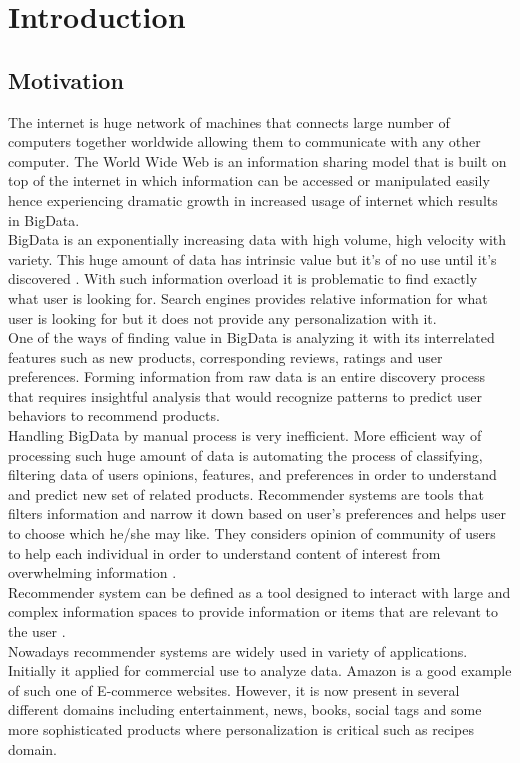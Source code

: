 \chapter{Introduction}
\section{Motivation}
The internet is huge network of machines that connects large number of computers together worldwide allowing them to communicate with any other computer. The World Wide Web is an information sharing model that is built on top of the internet in which information can be accessed or manipulated easily hence experiencing dramatic growth in increased usage of internet which results in BigData. 
\\
BigData is an exponentially increasing data with high volume, high velocity with variety. This huge amount of data has intrinsic value but it's of no use until it's discovered \cite{2}. With such information overload it is problematic to find exactly what user is looking for. Search engines provides relative information for what user is looking for but it does not provide any personalization with it. 
\\
One of the ways of finding value in BigData is analyzing it with its interrelated features such as new products, corresponding reviews, ratings and user preferences. Forming information from raw data is an entire discovery process that requires insightful analysis that would recognize patterns to predict user behaviors to recommend products.
\\
Handling BigData by manual process is very inefficient. More efficient way of processing such huge amount of data is automating the process of classifying, filtering data of users opinions, features, and preferences in order to understand and predict new set of related products.  Recommender systems are tools that filters information and narrow it down based on user's preferences and helps user to choose which he/she may like. They considers opinion of community of users to help each individual in order to understand content of interest from overwhelming information \cite{1}. 
\\ 
Recommender system can be defined as a tool designed to interact with large and complex information spaces to provide information or items that are relevant to the user \cite{4}.
\\
Nowadays recommender systems are widely used in variety of applications. Initially it applied for commercial use to analyze data. Amazon is a good example of such one of E-commerce websites. However, it is now present in several different domains including entertainment, news, books, social tags and some more sophisticated products where personalization is critical such as recipes domain.
